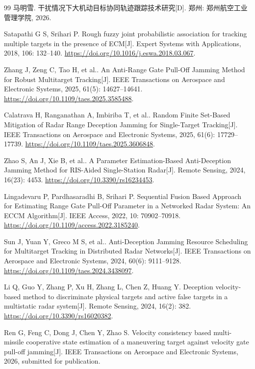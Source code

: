 \documentclass[UTF8,a4paper,zihao=-4]{ctexart}
\begin{document}
{\footnotesize
\begin{thebibliography}{99}
 马明雪. 干扰情况下大机动目标协同轨迹跟踪技术研究[D]. 郑州: 郑州航空工业管理学院, 2026.

 Satapathi G S, Srihari P. Rough fuzzy joint probabilistic association for tracking multiple targets in the presence of ECM[J]. Expert Systems with Applications, 2018, 106: 132--140.
\url{https://doi.org/10.1016/j.eswa.2018.03.067}.

 Zhang J, Zeng C, Tao H, et al.. An Anti-Range Gate Pull-Off Jamming Method for Robust Multitarget Tracking[J]. IEEE Transactions on Aerospace and Electronic Systems, 2025, 61(5): 14627--14641.
\url{https://doi.org/10.1109/taes.2025.3585488}.

 Calatrava H, Ranganathan A, Imbiriba T, et al.. Random Finite Set-Based Mitigation of Radar Range Deception Jamming for Single-Target Tracking[J]. IEEE Transactions on Aerospace and Electronic Systems, 2025, 61(6): 17729--17739.
\url{https://doi.org/10.1109/taes.2025.3606848}.

 Zhao S, An J, Xie B, et al.. A Parameter Estimation-Based Anti-Deception Jamming Method for RIS-Aided Single-Station Radar[J]. Remote Sensing, 2024, 16(23): 4453.
\url{https://doi.org/10.3390/rs16234453}.

 Lingadevaru P, Pardhasaradhi B, Srihari P. Sequential Fusion Based Approach for Estimating Range Gate Pull-Off Parameter in a Networked Radar System: An ECCM Algorithm[J]. IEEE Access, 2022, 10: 70902--70918.
\url{https://doi.org/10.1109/access.2022.3185240}.

 Sun J, Yuan Y, Greco M S, et al.. Anti-Deception Jamming Resource Scheduling for Multitarget Tracking in Distributed Radar Networks[J]. IEEE Transactions on Aerospace and Electronic Systems, 2024, 60(6): 9111--9128.
\url{https://doi.org/10.1109/taes.2024.3438097}.

 Li Q, Guo Y, Zhang P, Xu H, Zhang L, Chen Z, Huang Y. Deception velocity-based method to discriminate physical targets and active false targets in a multistatic radar system[J]. Remote Sensing, 2024, 16(2): 382. \url{https://doi.org/10.3390/rs16020382}.

 Ren G, Feng C, Dong J, Chen Y, Zhao S. Velocity consistency based multi-missile cooperative state estimation of a maneuvering target against velocity gate pull-off jamming[J]. IEEE Transactions on Aerospace and Electronic Systems, 2026, submitted for publication.


\end{thebibliography}}
\end{document}
